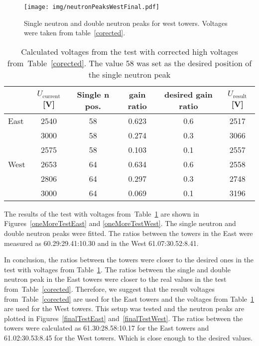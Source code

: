 \begin{figure}[htb]
\begin{center}
\texttt{[image: img/neutronPeaksWestFinal.pdf]}
\end{center}
\caption{Single neutron and double neutron peaks for west towers.
Voltages were taken from table~\ref{corected}.}
\label{westThird}
\end{figure}

\begin{table}[htb] 
\caption{Calculated voltages from the test with corrected high voltages from~Table~\ref{corected}.
The value 58 was set as the desired position of the single neutron peak}
\label{thirdCalib}
\begin{center}
\begin{tabular}{lccccc}
 \toprule
 &$U_\text{current}$[V]&Single n pos.&gain ratio&desired gain ratio&$U_\text{result}$[V]\\
\midrule
East  &2540  &58 &0.623  &0.6 &2517 \\
      &3000  &58 &0.274  &0.3 &3066 \\
      &2575  &58 &0.103	&0.1 &2557 \\
\midrule
West  &2653  &64 &0.634 &0.6 &2558 \\
      &2806  &64 &0.297 &0.3 &2748 \\
      &3000  &64 &0.069 &0.1 &3196 \\
\bottomrule
\end{tabular}
\end{center}
\end{table}

The results of the test with voltages from~Table~\ref{thirdCalib} are shown in
Figures~\ref{oneMoreTestEast} and \ref{oneMoreTestWest}\@. The single neutron and double
neutron peaks were fitted. The ratios between the towers in the East were measured as
60.29:29.41:10.30 and in the West 61.07:30.52:8.41. 

In conclusion, the ratios between the towers were closer to the desired ones in the
test with voltages from Table~\ref{thirdCalib}. The ratios between the single and double
neutron peak in the East towers were closer to the real values in the test
from~Table~\ref{corected}. Therefore, we suggest that the result voltages from~Table~\ref{corected}
are used for the East towers and the voltages from Table~\ref{thirdCalib} are used for the
West towers. This setup was tested and the neutron peaks are plotted in Figures~\ref{finalTestEast}
and~\ref{finalTestWest}. The ratios between the towers were calculated as
61.30:28.58:10.17 for the East towers and 61.02:30.53:8.45 for the West towers.
Which is close enough to the desired values.

